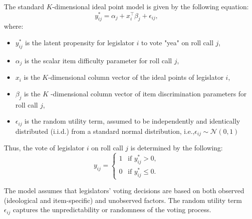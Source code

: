 \documentclass[a4paper,12pt]{report}
\begin{document}
                The standard \( K \)-dimensional ideal point model is given by the following equation:
                \[
                    y^*_{ij} = \alpha_j + x_i^\top \beta_j + \epsilon_{ij},
                \]
                where:
                \begin{itemize}
                    \item \( y^*_{ij} \) is the latent propensity for legislator \( i \) to vote "yea" on roll call
                    \( j \),
                    \item \( \alpha_j \) is the scalar item difficulty parameter for roll call \( j \),
                    \item \( x_i \) is the \( K \)-dimensional column vector of the ideal points of legislator \( i \),
                    \item \( \beta_j \) is the \( K \)
                    -dimensional column vector of item discrimination parameters for roll call
                    \( j \),
                    \item \( \epsilon_{ij} \)
                    is the random utility term, assumed to be independently and identically distributed (i.i.d.) from a
                    standard
                    normal distribution, i.e.,\( \epsilon_{ij} \sim \mathcal{N}(0, 1) \)
                \end{itemize}

                Thus, the vote of legislator \( i \) on roll call \( j \) is determined by the following:
                \[
                    y_{ij} =
                    \begin{cases}
                        1 & \text{if } y^*_{ij} > 0, \\
                        0 & \text{if } y^*_{ij} \leq 0.
                    \end{cases}
                \]

                The model assumes that legislators' voting decisions are based on both observed (ideological and
                item-specific) and
                unobserved factors. The random utility term \( \epsilon_{ij} \)
                captures the unpredictability or randomness of the voting process.
\end{document}
